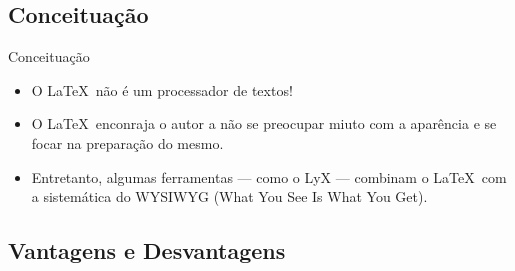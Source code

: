 \documentclass{beamer}
\begin{document}
\subsection{Conceituação}

\begin{frame}{Conceituação}
    \begin{itemize}
    \item<alert@1> O \LaTeX\ não é um processador de textos!
    \item O \LaTeX\ enconraja o autor a não se preocupar miuto com a aparência e se focar na preparação do mesmo.
    \item Entretanto, algumas ferramentas — como o LyX — combinam o \LaTeX\ com a sistemática do WYSIWYG (What You See Is What You Get).
    \end{itemize}
\end{frame}

\subsection{Vantagens e Desvantagens}
\end{document}
